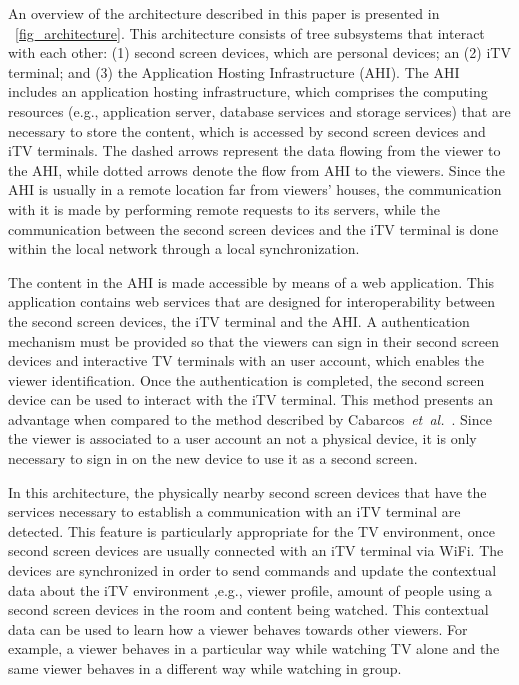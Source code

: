 \documentclass[journal]{IEEEtran}
\begin{document}
An overview of the architecture described in this paper is presented in \figurename~\ref{fig_architecture}. This architecture consists of tree subsystems that interact with each other: (1) second screen devices, which are personal devices; an (2) iTV terminal; and (3) the Application Hosting Infrastructure (AHI). The AHI includes an application hosting infrastructure, which comprises the computing resources (e.g., application server, database services and storage services) that are necessary to store the content, which is accessed by second screen devices and iTV terminals. The dashed arrows represent the data flowing from the viewer to the AHI, while dotted arrows denote the flow from AHI to the viewers. Since the AHI is usually in a remote location far from viewers' houses, the communication with it is made by performing remote requests to its servers, while the communication between the second screen devices and the iTV terminal is done within the local network through a local synchronization.

The content in the AHI is made accessible by means of a web application. This application contains web services that are designed for interoperability between the second screen devices, the iTV terminal and the AHI. A authentication mechanism must be provided so that the viewers can sign in their second screen devices and interactive TV terminals with an user account, which enables the viewer identification. Once the authentication is completed, the second screen device can be used to interact with the iTV terminal. This method presents an advantage when compared to the method described by Cabarcos~\emph{et~al.}~\cite{Cabarcos2011}. Since the viewer is associated to a user account an not a physical device, it is only necessary to sign in on the new device to use it as a second screen.

In this architecture, the physically nearby second screen devices that have the services necessary to establish a communication with an iTV terminal are detected. This feature is particularly appropriate for the TV environment, once second screen devices are usually connected with an iTV terminal via WiFi. The devices are synchronized in order to send commands and update the contextual data about the iTV environment ,e.g., viewer profile, amount of people using a second screen devices in the room and content being watched. This contextual data can be used to learn how a viewer behaves towards other viewers. For example, a viewer behaves in a particular way while watching TV alone and the same viewer behaves in a different way while watching in group.
\end{document}
